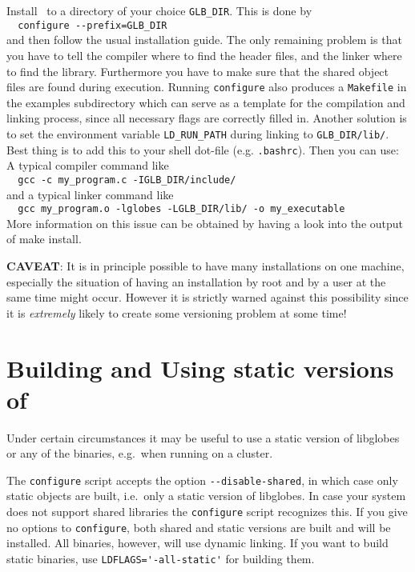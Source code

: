 Install \GLOBES\ to a directory of your choice \verb+GLB_DIR+. This is done by\\
\verb+  configure --prefix=GLB_DIR+\\ 
and then follow the usual
installation guide. The only remaining problem is that you
have to tell the compiler where to find the header files, and
the linker where to find the library. Furthermore you have to
make sure that the shared object files are found during
execution. Running \verb+configure+ also produces a \verb+Makefile+ in
the examples subdirectory which can serve as a template for
the compilation and linking process, since all necessary flags
are correctly filled in. Another solution is to set the
environment variable \verb+LD_RUN_PATH+ during linking to
\verb+GLB_DIR/lib/+. Best thing is to add this to your shell dot-file
(e.g. \verb+.bashrc+). Then you can use: A typical compiler command
like\\
\verb+  gcc -c my_program.c -IGLB_DIR/include/+\\
and a typical linker command like\\
\verb+  gcc my_program.o -lglobes -LGLB_DIR/lib/ -o my_executable+\\
More information on this issue can be obtained by having a look into
the output of make install.

{\bf CAVEAT}: It is in principle possible to have many installations on one
machine, especially the situation of having an installation by root
and by a user at the same time might occur. However it is strictly
warned against this possibility since it is \emph{extremely} likely to
create some versioning problem at some time!

\section*{Building and Using static versions of \GLOBES}


Under certain circumstances it may be useful to use a static version of
libglobes or any of the binaries, e.g.\ when running on a cluster.

The \verb+configure+ script accepts the option \verb+--disable-shared+, in
which case only static objects are built, i.e.\ only a static
version of libglobes. In case your system does not support shared
libraries the \verb+configure+ script recognizes this. If you give no
options to \verb+configure+, both shared and static versions are built
and will be installed. All binaries, however, will use dynamic
linking. If you want to build static binaries, use
\verb+LDFLAGS='-all-static'+ for building them.

